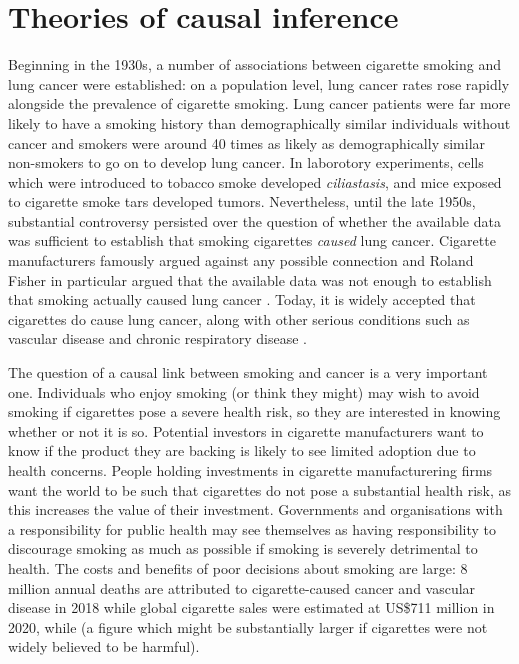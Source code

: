 



\section{Theories of causal inference}


Beginning in the 1930s, a number of associations between cigarette smoking and lung cancer were established: on a population level, lung cancer rates rose rapidly alongside the prevalence of cigarette smoking. Lung cancer patients were far more likely to have a smoking history than demographically similar individuals without cancer and smokers were around 40 times as likely as demographically similar non-smokers to go on to develop lung cancer. In laborotory experiments, cells which were introduced to tobacco smoke developed \emph{ciliastasis}, and mice exposed to cigarette smoke tars developed tumors\citep{proctor_history_2012}. Nevertheless, until the late 1950s, substantial controversy persisted over the question of whether the available data was sufficient to establish that smoking cigarettes \emph{caused} lung cancer. Cigarette manufacturers famously argued against any possible connection \citep{oreskes_merchants_2011} and Roland Fisher in particular argued that the available data was not enough to establish that smoking actually caused lung cancer \citep{fisher_cancer_1958}. Today, it is widely accepted that cigarettes do cause lung cancer, along with other serious conditions such as vascular disease and chronic respiratory disease \citep{world_health_organisation_tobacco_nodate,wiblin_why_2016}.

The question of a causal link between smoking and cancer is a very important one. Individuals who enjoy smoking (or think they might) may wish to avoid smoking if cigarettes pose a severe health risk, so they are interested in knowing whether or not it is so. Potential investors in cigarette manufacturers want to know if the product they are backing is likely to see limited adoption due to health concerns. People holding investments in cigarette manufacturering firms want the world to be such that cigarettes do not pose a substantial health risk, as this increases the value of their investment. Governments and organisations with a responsibility for public health may see themselves as having responsibility to discourage smoking as much as possible if smoking is severely detrimental to health. The costs and benefits of poor decisions about smoking are large: 8 million annual deaths are attributed to cigarette-caused cancer and vascular disease in 2018\citep{world_health_organisation_tobacco_nodate} while  global cigarette sales were estimated at US\$711 million in 2020, while \citep{noauthor_cigarettes_nodate} (a figure which might be substantially larger if cigarettes were not widely believed to be harmful).

